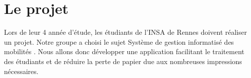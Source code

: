 
	\chapter{Le projet}
	 Lors de leur 4\ieme{} année d'étude, les étudiants de l'INSA de Rennes doivent réaliser un projet. Notre groupe a choisi %
	  le sujet \og Système de gestion informatisé des mobilités \fg. Nous allons donc développer une application facilitant le traitement des étudiants et de réduire la perte de papier due aux nombreuses impressions nécessaires.
